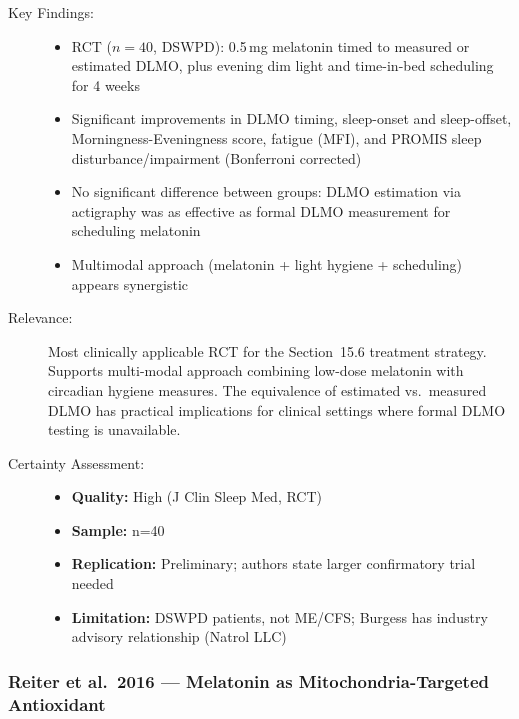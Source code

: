 \begin{description}
    \item[Key Findings:]
    \begin{itemize}
        \item RCT ($n=40$, DSWPD): 0.5\,mg melatonin timed to measured or estimated DLMO, plus evening dim light and time-in-bed scheduling for 4 weeks
        \item Significant improvements in DLMO timing, sleep-onset and sleep-offset, Morningness-Eveningness score, fatigue (MFI), and PROMIS sleep disturbance/impairment (Bonferroni corrected)
        \item No significant difference between groups: DLMO estimation via actigraphy was as effective as formal DLMO measurement for scheduling melatonin
        \item Multimodal approach (melatonin + light hygiene + scheduling) appears synergistic
    \end{itemize}
    \item[Relevance:] Most clinically applicable RCT for the Section~15.6 treatment strategy. Supports multi-modal approach combining low-dose melatonin with circadian hygiene measures. The equivalence of estimated vs.\ measured DLMO has practical implications for clinical settings where formal DLMO testing is unavailable.
    \item[Certainty Assessment:]
    \begin{itemize}
        \item \textbf{Quality:} High (J Clin Sleep Med, RCT)
        \item \textbf{Sample:} n=40
        \item \textbf{Replication:} Preliminary; authors state larger confirmatory trial needed
        \item \textbf{Limitation:} DSWPD patients, not ME/CFS; Burgess has industry advisory relationship (Natrol LLC)
    \end{itemize}
\end{description}

\subsubsection*{Reiter et al.\ 2016 --- Melatonin as Mitochondria-Targeted Antioxidant}


